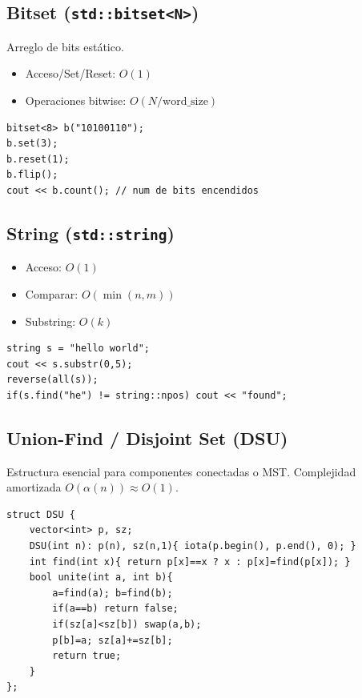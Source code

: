\documentclass{article}
\begin{document}
\subsection{Bitset (\texttt{std::bitset<N>})}

Arreglo de bits estático.

\begin{itemize}
  \item Acceso/Set/Reset: \(O(1)\)
  \item Operaciones bitwise: \(O(N / \text{word\_size})\)
\end{itemize}

\begin{lstlisting}[style=cppstyle]
bitset<8> b("10100110");
b.set(3);
b.reset(1);
b.flip();
cout << b.count(); // num de bits encendidos
\end{lstlisting}


\subsection{String (\texttt{std::string})}

\begin{itemize}
  \item Acceso: \(O(1)\)
  \item Comparar: \(O(\min(n,m))\)
  \item Substring: \(O(k)\)
\end{itemize}

\begin{lstlisting}[style=cppstyle]
string s = "hello world";
cout << s.substr(0,5);
reverse(all(s));
if(s.find("he") != string::npos) cout << "found";
\end{lstlisting}


\subsection{Union-Find / Disjoint Set (DSU)}

Estructura esencial para componentes conectadas o MST.  
Complejidad amortizada \(O(\alpha(n)) \approx O(1)\).

\begin{lstlisting}[style=cppstyle]
struct DSU {
    vector<int> p, sz;
    DSU(int n): p(n), sz(n,1){ iota(p.begin(), p.end(), 0); }
    int find(int x){ return p[x]==x ? x : p[x]=find(p[x]); }
    bool unite(int a, int b){
        a=find(a); b=find(b);
        if(a==b) return false;
        if(sz[a]<sz[b]) swap(a,b);
        p[b]=a; sz[a]+=sz[b];
        return true;
    }
};
\end{lstlisting}
\end{document}
